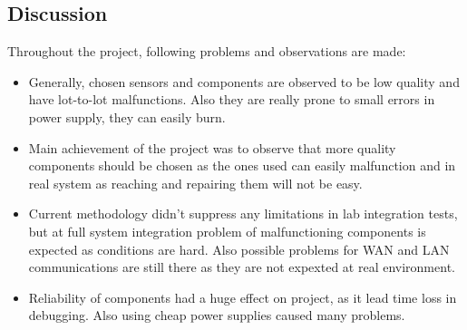 \documentclass[conference]{IEEEtran}
\begin{document}
\subsection{Discussion}
Throughout the project, following problems and observations are made:
\begin{itemize}
    \item Generally, chosen sensors and components are observed to be low quality and have lot-to-lot malfunctions. Also they are really prone to small errors in power supply, they can easily burn.
    \item Main achievement of the project was to observe that more quality components should be chosen as the ones used can easily malfunction and in real system as reaching and repairing them will not be easy.
    \item Current methodology didn't suppress any limitations in lab integration tests, but at full system integration problem of malfunctioning components is expected as conditions are hard. Also possible problems for WAN and LAN communications are still there as they are not expexted at real environment.
    \item Reliability of components had a huge effect on project, as it lead time loss in debugging. Also using cheap power supplies caused many problems.
\end{itemize}
\end{document}
